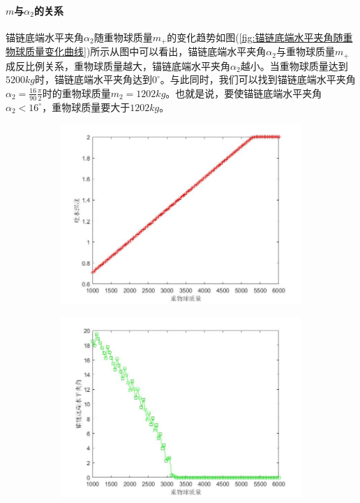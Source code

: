             \paragraph{$m$与$\alpha_2$的关系}锚链底端水平夹角$\alpha_2$随重物球质量$m_+$的变化趋势如图(\ref{fig:锚链底端水平夹角随重物球质量变化曲线})所示从图中可以看出，锚链底端水平夹角$\alpha_2$与重物球质量$m_+$成反比例关系，重物球质量越大，锚链底端水平夹角$\alpha_2$越小。当重物球质量达到 $5200kg $时，锚链底端水平夹角达到$0^\circ$。与此同时，我们可以找到锚链底端水平夹角$\alpha_2=\frac{16}{90}\frac{\pi}{2}$时的重物球质量$m_2 = 1202kg$。也就是说，要使锚链底端水平夹角$\alpha_2 <16^\circ$，重物球质量要大于$1202kg $。
            \begin{figure}[H]
                \centering
                \begin{subfigure}[b]{0.4\textwidth}
                    \includegraphics[width=\textwidth]{images/h_m+.jpg}
                    \caption{}
                    \label{fig:吃水深度h随重物球质量变化曲线}
                \end{subfigure}
                \begin{subfigure}[b]{0.4\textwidth}
                    \includegraphics[width=\textwidth]{images/alpha2_m+.jpg}

\end{subfigure}
\end{figure}
